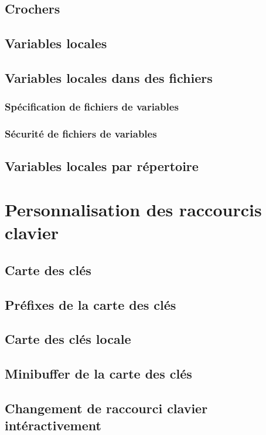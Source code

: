 \subsection{Crochers}\label{chap33sec2subsec2}
\subsection{Variables locales}\label{chap33sec2subsec3}
\subsection{Variables locales dans des fichiers}
\subsubsection{Spécification de fichiers de variables}
\subsubsection{Sécurité de fichiers de variables}
\subsection{Variables locales par répertoire}\label{chap33sec2subsec4}
\section{Personnalisation des raccourcis clavier}\label{chap33sec3}
\subsection{Carte des clés}\label{chap33sec3subsec1}
\subsection{Préfixes de la carte des clés}\label{chap33sec3subsec2}
\subsection{Carte des clés locale}\label{chap33sec3subsec3}
\subsection{Minibuffer de la carte des clés}\label{chap33sec3subsec4}
\subsection{Changement de raccourci clavier
  intéractivement}\label{chap33sec3subsec5} 
